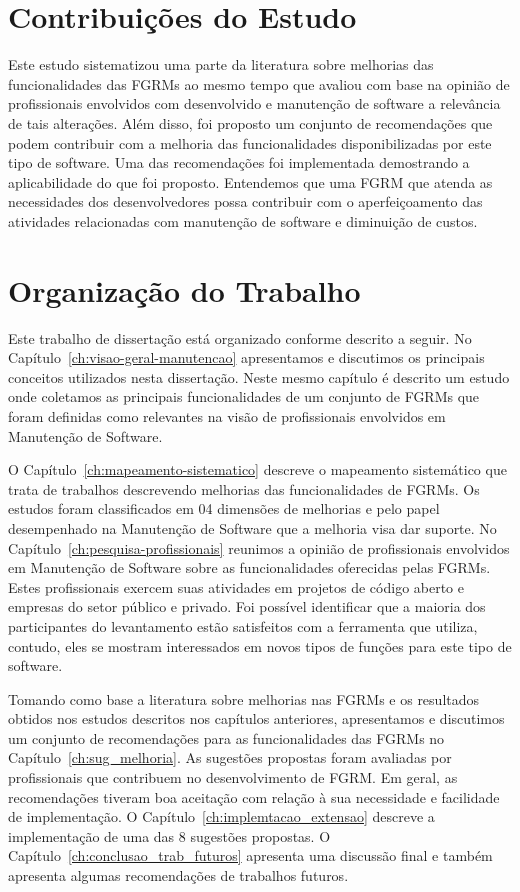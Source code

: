 \section{Contribuições do Estudo}
\label{sec:intro-contribuicao}

Este estudo sistematizou uma parte da literatura sobre melhorias das
funcionalidades das FGRMs ao mesmo tempo que avaliou com base na opinião de
profissionais envolvidos com desenvolvido e manutenção de software a relevância
de tais alterações. Além disso, foi proposto um conjunto de recomendações que
podem contribuir com a melhoria das funcionalidades disponibilizadas por este
tipo de software. Uma das recomendações foi implementada demostrando a
aplicabilidade do que foi proposto. Entendemos que uma FGRM que atenda as
necessidades dos desenvolvedores possa contribuir com o aperfeiçoamento das
atividades relacionadas com manutenção de software e diminuição de custos.

\section{Organização do Trabalho}
\label{sec:intro-organizacao-dissertacao}

Este trabalho de dissertação está organizado conforme descrito a seguir. No
Capítulo~\ref{ch:visao-geral-manutencao} apresentamos e discutimos os principais
conceitos utilizados nesta dissertação. Neste mesmo capítulo é descrito um
estudo onde coletamos as principais funcionalidades de um conjunto de FGRMs que
foram definidas como relevantes na visão de profissionais envolvidos em
Manutenção de Software.

O Capítulo~\ref{ch:mapeamento-sistematico} descreve o mapeamento sistemático que
trata de trabalhos descrevendo melhorias das funcionalidades de FGRMs. Os
estudos foram classificados em 04 dimensões de melhorias e pelo papel
desempenhado na Manutenção de Software que a melhoria visa dar suporte. No
Capítulo~\ref{ch:pesquisa-profissionais} reunimos a opinião de profissionais
envolvidos em Manutenção de Software sobre as funcionalidades oferecidas pelas
FGRMs. Estes profissionais exercem suas atividades em projetos de código aberto
e empresas do setor público e privado. Foi possível identificar que a maioria
dos participantes do levantamento estão satisfeitos com a ferramenta que
utiliza, contudo, eles se mostram interessados em novos tipos de funções para
este tipo de software.

Tomando como base a literatura sobre melhorias nas FGRMs e os resultados obtidos
nos estudos descritos nos capítulos anteriores, apresentamos e discutimos um
conjunto de recomendações para as funcionalidades das FGRMs no
Capítulo~\ref{ch:sug_melhoria}. As sugestões propostas foram avaliadas por
profissionais que contribuem no desenvolvimento de FGRM\@. Em geral, as
recomendações tiveram boa aceitação com relação à sua necessidade e facilidade
de implementação. O Capítulo~\ref{ch:implemtacao_extensao} descreve a
implementação de uma das 8 sugestões propostas. O
Capítulo~\ref{ch:conclusao_trab_futuros} apresenta uma discussão final e também
apresenta algumas recomendações de trabalhos futuros.
